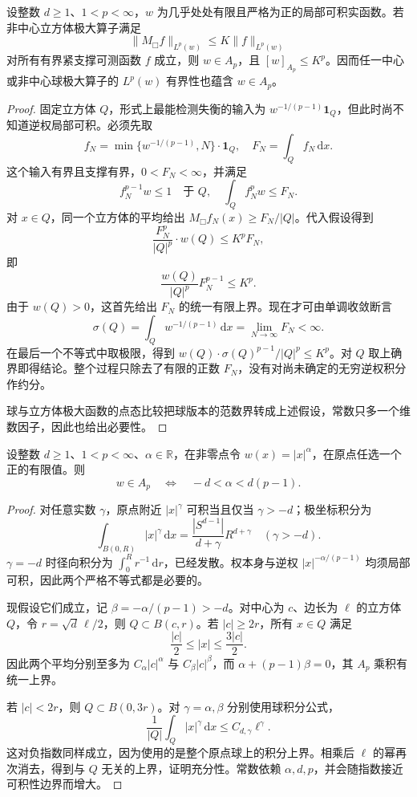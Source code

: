 \begin{proposition}[\(A_p\) 的必要性]
\label{b2:prop:C-ap-necessary}
设整数 \(d\geq1\)、\(1<p<\infty\)，\(w\) 为几乎处处有限且严格为正的局部可积实函数。若非中心立方体极大算子满足
\[
 \|M_\mdlgwhtsquare f\|_{L^p(w)}\leq K\|f\|_{L^p(w)}
\]
对所有有界紧支撑可测函数 \(f\) 成立，则 \(w\in A_p\)，且
\([w]_{A_p}\leq K^p\)。因而任一中心或非中心球极大算子的
\(L^p(w)\) 有界性也蕴含 \(w\in A_p\)。
\end{proposition}
\begin{proof}
固定立方体 \(Q\)，形式上最能检测失衡的输入为
\(w^{-1/(p-1)}\mathbf1_Q\)，但此时尚不知道逆权局部可积。必须先取
\[
 f_N=\min\{w^{-1/(p-1)},N\}\cdot\mathbf1_Q,\quad
 F_N=\int_Qf_N\,\mathrm dx.
\]
这个输入有界且支撑有界，\(0<F_N<\infty\)，并满足
\[
 f_N^{p-1}w\leq1\quad\text{于 }Q,
 \quad
 \int_Qf_N^pw\leq F_N.
\]
对 \(x\in Q\)，同一个立方体的平均给出
\(M_\mdlgwhtsquare f_N(x)\geq F_N/|Q|\)。代入假设得到
\[
 \frac{F_N^p}{|Q|^p}\cdot w(Q)\leq K^pF_N,
\]
即
\[
 \frac{w(Q)}{|Q|^p}F_N^{p-1}\leq K^p.
\]
由于 \(w(Q)>0\)，这首先给出 \(F_N\) 的统一有限上界。现在才可由单调收敛断言
\[
 \sigma(Q)=\int_Qw^{-1/(p-1)}\,\mathrm dx
       =\lim_{N\to\infty}F_N<\infty.
\]
在最后一个不等式中取极限，得到
\(w(Q)\cdot\sigma(Q)^{p-1}/|Q|^p\leq K^p\)。对 \(Q\) 取上确界即得结论。整个过程只除去了有限的正数 \(F_N\)，没有对尚未确定的无穷逆权积分作约分。

球与立方体极大函数的点态比较把球版本的范数界转成上述假设，常数只多一个维数因子，因此也给出必要性。
\end{proof}

\begin{proposition}[幂权的准确范围]
\label{b2:prop:C-power-weight}
设整数 \(d\geq1\)、\(1<p<\infty\)、\(\alpha\in\mathbb R\)，在非零点令 \(w(x)=|x|^\alpha\)，在原点任选一个正的有限值。则
\[
 w\in A_p
       \quad\Longleftrightarrow\quad
       -d<\alpha<d(p-1).
\]
\end{proposition}
\begin{proof}
对任意实数 \(\gamma\)，原点附近
\(|x|^\gamma\) 可积当且仅当 \(\gamma>-d\)；极坐标积分为
\[
 \int_{B(0,R)}|x|^\gamma\,\mathrm dx
       =\frac{|S^{d-1}|}{d+\gamma}R^{d+\gamma}
       \quad(\gamma>-d).
\]
\(\gamma=-d\) 时径向积分为 \(\int_0^Rr^{-1}\,\mathrm dr\)，已经发散。权本身与逆权
\(|x|^{-\alpha/(p-1)}\) 均须局部可积，因此两个严格不等式都是必要的。

现假设它们成立，记 \(\beta=-\alpha/(p-1)>-d\)。对中心为 \(c\)、边长为 \(\ell\) 的立方体 \(Q\)，令
\(r=\sqrt d\,\ell/2\)，则 \(Q\subset B(c,r)\)。若
\(|c|\geq2r\)，所有 \(x\in Q\) 满足
\[
 \frac{|c|}{2}\leq|x|\leq\frac{3|c|}{2}.
\]
因此两个平均分别至多为
\(C_\alpha|c|^\alpha\) 与 \(C_\beta|c|^\beta\)，而
\(\alpha+(p-1)\beta=0\)，其 \(A_p\) 乘积有统一上界。

若 \(|c|<2r\)，则 \(Q\subset B(0,3r)\)。对
\(\gamma=\alpha,\beta\) 分别使用球积分公式，
\[
 \frac1{|Q|}\int_Q|x|^\gamma\,\mathrm dx
       \leq C_{d,\gamma}\ell^\gamma.
\]
这对负指数同样成立，因为使用的是整个原点球上的积分上界。相乘后 \(\ell\) 的幂再次消去，得到与 \(Q\) 无关的上界，证明充分性。常数依赖 \(\alpha,d,p\)，并会随指数接近可积性边界而增大。
\end{proof}

